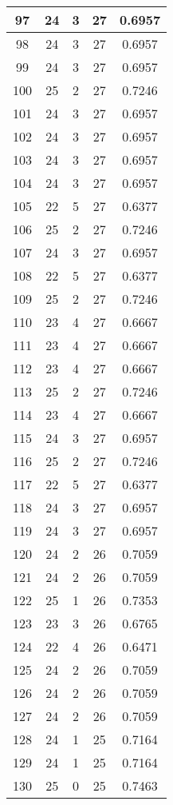\documentclass[letterpaper, 12pt]{article}
\begin{document}
\begin{longtable}{|c|c|c|c|c|}
\hline
97 & 24 & 3 & 27 & 0.6957 \\
\hline
98 & 24 & 3 & 27 & 0.6957 \\
\hline
99 & 24 & 3 & 27 & 0.6957 \\
\hline
100 & 25 & 2 & 27 & 0.7246 \\
\hline
101 & 24 & 3 & 27 & 0.6957 \\
\hline
102 & 24 & 3 & 27 & 0.6957 \\
\hline
103 & 24 & 3 & 27 & 0.6957 \\
\hline
104 & 24 & 3 & 27 & 0.6957 \\
\hline
105 & 22 & 5 & 27 & 0.6377 \\
\hline
106 & 25 & 2 & 27 & 0.7246 \\
\hline
107 & 24 & 3 & 27 & 0.6957 \\
\hline
108 & 22 & 5 & 27 & 0.6377 \\
\hline
109 & 25 & 2 & 27 & 0.7246 \\
\hline
110 & 23 & 4 & 27 & 0.6667 \\
\hline
111 & 23 & 4 & 27 & 0.6667 \\
\hline
112 & 23 & 4 & 27 & 0.6667 \\
\hline
113 & 25 & 2 & 27 & 0.7246 \\
\hline
114 & 23 & 4 & 27 & 0.6667 \\
\hline
115 & 24 & 3 & 27 & 0.6957 \\
\hline
116 & 25 & 2 & 27 & 0.7246 \\
\hline
117 & 22 & 5 & 27 & 0.6377 \\
\hline
118 & 24 & 3 & 27 & 0.6957 \\
\hline
119 & 24 & 3 & 27 & 0.6957 \\
\hline
120 & 24 & 2 & 26 & 0.7059 \\
\hline
121 & 24 & 2 & 26 & 0.7059 \\
\hline
122 & 25 & 1 & 26 & 0.7353 \\
\hline
123 & 23 & 3 & 26 & 0.6765 \\
\hline
124 & 22 & 4 & 26 & 0.6471 \\
\hline
125 & 24 & 2 & 26 & 0.7059 \\
\hline
126 & 24 & 2 & 26 & 0.7059 \\
\hline
127 & 24 & 2 & 26 & 0.7059 \\
\hline
128 & 24 & 1 & 25 & 0.7164 \\
\hline
129 & 24 & 1 & 25 & 0.7164 \\
\hline
130 & 25 & 0 & 25 & 0.7463 \\

\end{longtable}
\end{document}
